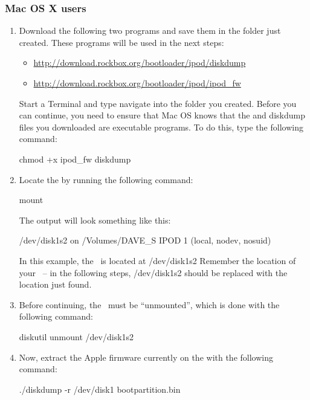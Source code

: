 \subsubsection{Mac OS X users}
\begin{enumerate}
  \item Download the following two programs and save them in the folder just
    created. These programs will be used in the next steps:
    \begin{itemize}
      \item \url{http://download.rockbox.org/bootloader/ipod/diskdump}
      \item \url{http://download.rockbox.org/bootloader/ipod/ipod_fw}
    \end{itemize}
    Start a Terminal and type navigate into the folder you created. Before
    you can continue, you need to ensure that Mac OS knows that the
    and diskdump files you downloaded are executable programs. To do this,
    type the following command:
    \begin{code}
    chmod +x ipod_fw diskdump
    \end{code}
  \item Locate the \dap{} by running the following command:
    \begin{code}
    mount
    \end{code}
    The output will look something like this: 
    \begin{code}
    /dev/disk1s2 on /Volumes/DAVE_S IPOD 1 (local, nodev, nosuid)
    \end{code}
    In this example, the \dap\ is located at /dev/disk1s2 Remember the 
    location of your \dap\  -- in the following steps, /dev/disk1s2 should be
    replaced with the location just found.
  \item Before continuing, the \dap\ must be ``unmounted'', which is
    done with the following command:
    \begin{code}
    diskutil unmount /dev/disk1s2
    \end{code}
  \item Now, extract the Apple firmware currently on the \dap{} with the
    following command:
    \begin{code}
    ./diskdump -r /dev/disk1 bootpartition.bin
    \end{code}
\end{enumerate}
